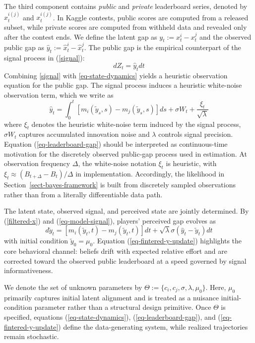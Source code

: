 \documentclass[mnsc]{informs3}
\begin{document}
The third component contains \textit{public} and \textit{private} leaderboard series, denoted by $\hat{x}^{i(j)}_t$ and $x^{i(j)}_t$.
In Kaggle contests, public scores are computed from a released subset, while private scores are computed from withheld data and revealed only after the contest ends.
We define the latent gap as $y_t:=x_t^i-x_t^j$ and the observed public gap as $\hat{y}_t:=\hat{x}_t^i-\hat{x}_t^j$.
The public gap is the empirical counterpart of the signal process in (\ref{signal}):
\begin{equation}\label{eq-model-signal}
dZ_t = \hat{y}_t dt
\end{equation}
Combining \eqref{signal} with \eqref{eq-state-dynamics} yields a heuristic observation equation for the public gap.
The signal process induces a heuristic white-noise observation term, which we write as
\begin{equation}\label{eq-leaderboard-gap}
\hat{y}_t = \int^t_0\left[m_i(\tilde{y}_s, s) - m_j(\tilde{y}_s, s)\right]ds + \sigma W_{t} + \frac{\xi_t}{\sqrt{\lambda}}
\end{equation}
where $\xi_t$ denotes the heuristic white-noise term induced by the signal process, $\sigma W_t$ captures accumulated innovation noise and $\lambda$ controls signal precision.
Equation (\ref{eq-leaderboard-gap}) should be interpreted as continuous-time motivation for the discretely observed public-gap process used in estimation.
At observation frequency $\Delta$, the white-noise notation $\xi_t$ is heuristic, with $\xi_t\approx(B_{t+\Delta}-B_t)/\Delta$ in implementation.
Accordingly, the likelihood in Section~\ref{sect-bayes-framework} is built from discretely sampled observations rather than from a literally differentiable data path.

The latent state, observed signal, and perceived state are jointly determined.
By (\ref{filtered-x}) and (\ref{eq-model-signal}), players’ perceived gap evolves as
\begin{equation}\label{eq-fintered-y-update}
d\tilde{y}_{t} = \left[m_i(\tilde{y}_t, t) - m_j(\tilde{y}_t, t)\right]dt + \sqrt{\lambda}\sigma(\hat{y}_t-\tilde{y}_{t}) dt
\end{equation}
with initial condition $\tilde{y}_0 = \mu_0$.
Equation (\ref{eq-fintered-y-update}) highlights the core behavioral channel: beliefs drift with expected relative effort and are corrected toward the observed public leaderboard at a speed governed by signal informativeness.

We denote the set of unknown parameters by $\Theta := \{c_i, c_j, \sigma, \lambda, \mu_0\}$.
Here, $\mu_0$ primarily captures initial latent alignment and is treated as a nuisance initial-condition parameter rather than a structural design primitive.
Once $\Theta$ is specified, equations (\ref{eq-state-dynamics}), (\ref{eq-leaderboard-gap}), and (\ref{eq-fintered-y-update}) define the data-generating system, while realized trajectories remain stochastic.
\end{document}
